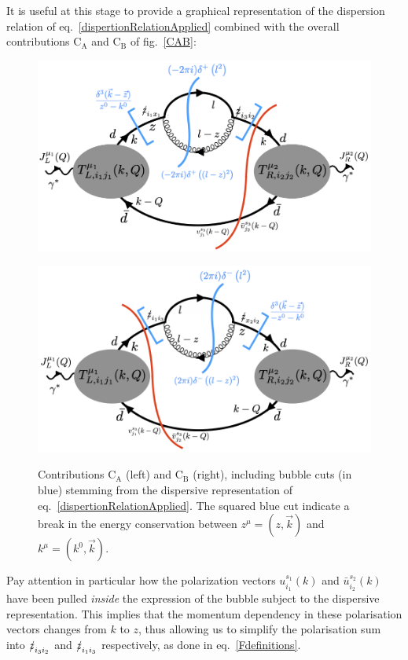 \documentclass[11pt]{article}
\begin{document}
It is useful at this stage to provide a graphical representation of the dispersion relation of eq.~\ref{dispertionRelationApplied} combined with the overall contributions ${\textrm{C}}_{\textrm{A}}$ and ${\textrm{C}}_{\textrm{B}}$ of fig.~\ref{CAB}:
\begin{figure}[ht!]
\begin{center}
\begin{minipage}{0.5\linewidth}
\centering
{\includegraphics[width=1\linewidth]{CA_bubble_cut.png}}
\end{minipage}\hfill
\begin{minipage}{0.5\linewidth}
\centering
{\includegraphics[width=1\linewidth]{CB_bubble_cut.png}}
\end{minipage}
{\caption{\label{CABwithBubbleCuts} Contributions C$_\textrm{A}$ (left) and C$_\textrm{B}$ (right), including bubble cuts (in blue) stemming from the dispersive representation of eq.~\ref{dispertionRelationApplied}. The squared blue cut indicate a break in the energy conservation between $z^\mu=(z,\vec{k})$ and $k^\mu=(k^0,\vec{k})$.}}
\end{center}
\end{figure}
Pay attention in particular how the polarization vectors $u_{i_1}^{s_1}(k)$ and $\bar{u}_{i_2}^{s_2}(k)$ have been pulled \emph{inside} the expression of the bubble subject to the dispersive representation. This implies that the momentum dependency in these polarisation vectors changes from $k$ to $z$, thus allowing us to simplify the polarisation sum into $\slashed{z}_{i_3 i_2}$ and $\slashed{z}_{i_1 i_3}$ respectively, as done in eq.~\ref{Fdefinitions}.
\end{document}
